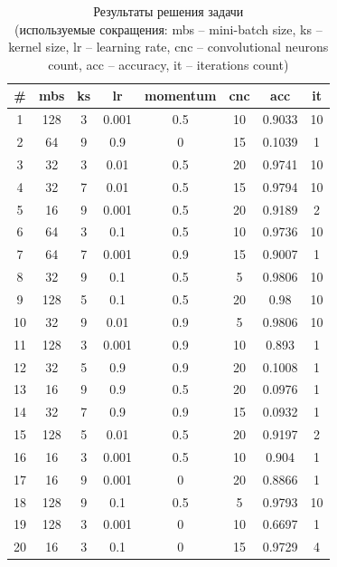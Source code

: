 \begin{textitemize}
\begin{table}[ht]
	\caption{Результаты решения задачи \\(используемые сокращения: mbs -- mini-batch size, ks -- kernel size, lr -- learning rate, cnc -- convolutional neurons count, acc -- accuracy, it -- iterations count)}
	\centering
	\begin{tabular}{c c c c c c c c}
		\hline\hline
		\# & mbs & ks & lr    & momentum & cnc & acc    & it \\ [0.5ex] %
		\hline
		1        & 128 & 3  & 0.001 & 0.5      & 10  & 0.9033 & 10 \\
		2        & 64  & 9  & 0.9   & 0        & 15  & 0.1039 & 1  \\
		3        & 32  & 3  & 0.01  & 0.5      & 20  & 0.9741 & 10 \\
		4        & 32  & 7  & 0.01  & 0.5      & 15  & 0.9794 & 10 \\
		5        & 16  & 9  & 0.001 & 0.5      & 20  & 0.9189 & 2  \\
		6        & 64  & 3  & 0.1   & 0.5      & 10  & 0.9736 & 10 \\
		7        & 64  & 7  & 0.001 & 0.9      & 15  & 0.9007 & 1  \\
		8        & 32  & 9  & 0.1   & 0.5      & 5   & 0.9806 & 10 \\
		9        & 128 & 5  & 0.1   & 0.5      & 20  & 0.98   & 10 \\
		10       & 32  & 9  & 0.01  & 0.9      & 5   & 0.9806 & 10 \\
		11       & 128 & 3  & 0.001 & 0.9      & 10  & 0.893  & 1  \\
		12       & 32  & 5  & 0.9   & 0.9      & 20  & 0.1008 & 1  \\
		13       & 16  & 9  & 0.9   & 0.5      & 20  & 0.0976 & 1  \\
		14       & 32  & 7  & 0.9   & 0.9      & 15  & 0.0932 & 1  \\
		15       & 128 & 5  & 0.01  & 0.5      & 20  & 0.9197 & 2  \\
		16       & 16  & 3  & 0.001 & 0.5      & 10  & 0.904  & 1  \\
		17       & 16  & 9  & 0.001 & 0        & 20  & 0.8866 & 1  \\
		18       & 128 & 9  & 0.1   & 0.5      & 5   & 0.9793 & 10 \\
		19       & 128 & 3  & 0.001 & 0        & 10  & 0.6697 & 1  \\
		20       & 16  & 3  & 0.1   & 0        & 15  & 0.9729 & 4  \\

\end{tabular}
\end{table}
\end{textitemize}
